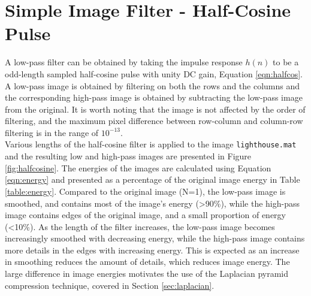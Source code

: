 \section{Simple Image Filter - Half-Cosine Pulse} \label{sec:half-cosine}

A low-pass filter can be obtained by taking the impulse response $h(n)$ to be a odd-length sampled half-cosine pulse with unity DC gain, Equation \ref{eqn:halfcos}. A low-pass image is obtained by filtering on both the rows and the columns and the corresponding high-pass image is obtained by subtracting the low-pass image from the original. It is worth noting that the image is not affected by the order of filtering, and the maximum pixel difference between row-column and column-row filtering is in the range of $10^{-13}$.\\

Various lengths of the half-cosine filter is applied to the image \texttt{lighthouse.mat} and the resulting low and high-pass images are presented in Figure \ref{fig:halfcosine}. The energies of the images are calculated using Equation \ref{eqn:energy} and presented as a percentage of the original image energy in Table \ref{table:energy}. Compared to the original image (N=1), the low-pass image is smoothed, and contains most of the image's energy (\textgreater 90\%), while the high-pass image contains edges of the original image, and a small proportion of energy (\textless 10\%). As the length of the filter increases, the low-pass image becomes increasingly smoothed with decreasing energy, while the high-pass image contains more details in the edges with increasing energy. This is expected as an increase in smoothing reduces the amount of details, which reduces image energy. The large difference in image energies motivates the use of the Laplacian pyramid compression technique, covered in Section \ref{sec:laplacian}.
